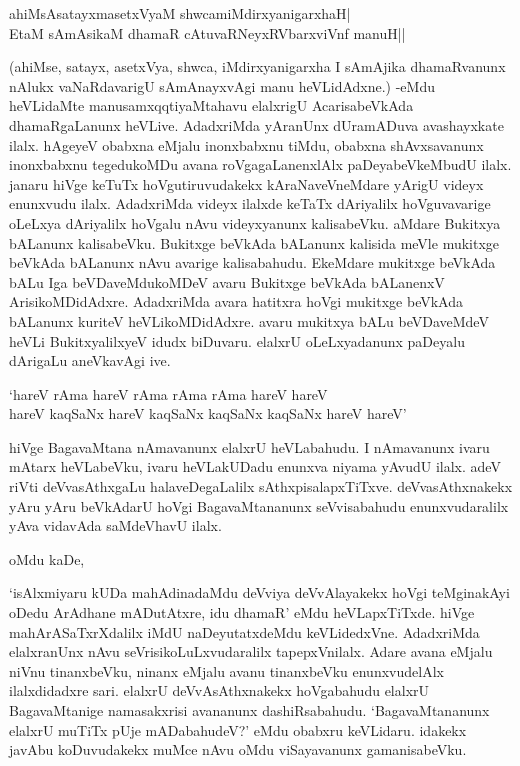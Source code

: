 \begin{shloka}
ahiMsAsatayxmasetxVyaM shwcamiMdirxyanigarxhaH|\\
EtaM sAmAsikaM dhamaR cAtuvaRNeyxRV\s barxviVnf manuH||
\end{shloka}

(ahiMse, satayx, asetxVya, shwca, iMdirxyanigarxha I sAmAjika dhamaRvanunx nAlukx vaNaRdavarigU sAmAnayxvAgi manu heVLidAdxne.) -eMdu heVLidaMte manusamxqqtiyaMtahavu elalxrigU AcarisabeVkAda dhamaRgaLanunx heVLive. AdadxriMda yAranUnx dUramADuva avashayxkate ilalx. hAgeyeV obabxna eMjalu inonxbabxnu tiMdu, obabxna shAvxsavanunx inonxbabxnu tegedukoMDu avana roVgagaLanenxlAlx paDeyabeVkeMbudU ilalx. janaru hiVge keTuTx hoVgutiruvudakekx kAraNaveVneMdare yArigU videyx enunxvudu ilalx. AdadxriMda videyx ilalxde keTaTx dAriyalilx hoVguvavarige oLeLxya dAriyalilx hoVgalu nAvu videyxyanunx kalisabeVku. aMdare Bukitxya bALanunx kalisabeVku. Bukitxge beVkAda bALanunx kalisida meVle mukitxge beVkAda bALanunx nAvu avarige kalisabahudu. EkeMdare mukitxge beVkAda bALu Iga beVDaveMdukoMDeV avaru Bukitxge beVkAda bALanenxV ArisikoMDidAdxre. AdadxriMda avara hatitxra hoVgi mukitxge beVkAda bALanunx kuriteV heVLikoMDidAdxre. avaru mukitxya bALu beVDaveMdeV heVLi BukitxyalilxyeV idudx biDuvaru. elalxrU oLeLxyadanunx paDeyalu dArigaLu aneVkavAgi ive.

\begin{shloka}
`hareV rAma hareV rAma rAma rAma hareV hareV\\
hareV kaqSaNx hareV kaqSaNx kaqSaNx kaqSaNx hareV hareV'
\end{shloka}

\noindent hiVge BagavaMtana nAmavanunx elalxrU heVLabahudu. I nAmavanunx ivaru mAtarx heVLabeVku, ivaru heVLakUDadu enunxva niyama yAvudU ilalx. adeV riVti deVvasAthxgaLu halaveDegaLalilx sAthxpisalapxTiTxve. deVvasAthxnakekx yAru yAru beVkAdarU hoVgi BagavaMtananunx seVvisabahudu enunxvudaralilx yAva vidavAda saMdeVhavU ilalx.

oMdu kaDe,

`isAlxmiyaru kUDa mahAdinadaMdu deVviya deVvAlayakekx hoVgi teMginakAyi oDedu ArAdhane mADutAtxre, idu dhamaR' eMdu heVLapxTiTxde. hiVge mahArASaTxrXdalilx iMdU naDeyutatxdeMdu keVLidedxVne. AdadxriMda elalxranUnx nAvu seVrisikoLuLxvudaralilx tapepxVnilalx. Adare avana eMjalu niVnu tinanxbeVku, ninanx eMjalu avanu tinanxbeVku enunxvudelAlx ilalxdidadxre sari. elalxrU deVvAsAthxnakekx hoVgabahudu elalxrU BagavaMtanige namasakxrisi avananunx dashiRsabahudu. `BagavaMtananunx elalxrU muTiTx pUje mADabahudeV?' eMdu obabxru keVLidaru. idakekx 
javAbu koDuvudakekx muMce nAvu oMdu viSayavanunx gamanisabeVku.

